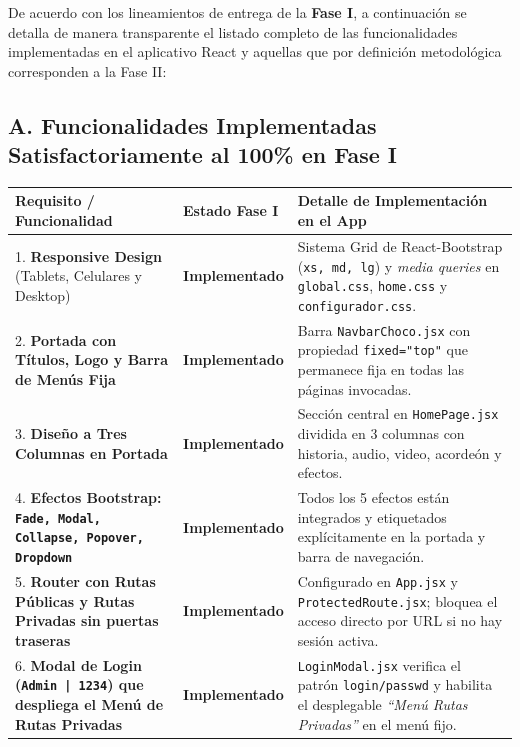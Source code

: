 \documentclass[12pt,letterpaper]{article}
\begin{document}
De acuerdo con los lineamientos de entrega de la \textbf{Fase I}, a continuación se detalla de manera transparente el listado completo de las funcionalidades implementadas en el aplicativo React y aquellas que por definición metodológica corresponden a la Fase II:

\subsection*{A. Funcionalidades Implementadas Satisfactoriamente al 100\% en Fase I}

\begin{longtable}{p{} p{} p{}}
\toprule
\textbf{Requisito / Funcionalidad} & \textbf{Estado Fase I} & \textbf{Detalle de Implementación en el App} \\
\midrule
\endhead
1. \textbf{Responsive Design} (Tablets, Celulares y Desktop) & \textcolor{verdexito}{\textbf{Implementado}} & Sistema Grid de React-Bootstrap (\texttt{xs, md, lg}) y \textit{media queries} en \texttt{global.css}, \texttt{home.css} y \texttt{configurador.css}. \\
\midrule
2. \textbf{Portada con Títulos, Logo y Barra de Menús Fija} & \textcolor{verdexito}{\textbf{Implementado}} & Barra \texttt{NavbarChoco.jsx} con propiedad \texttt{fixed="top"} que permanece fija en todas las páginas invocadas. \\
\midrule
3. \textbf{Diseño a Tres Columnas en Portada} & \textcolor{verdexito}{\textbf{Implementado}} & Sección central en \texttt{HomePage.jsx} dividida en 3 columnas con historia, audio, video, acordeón y efectos. \\
\midrule
4. \textbf{Efectos Bootstrap: \texttt{Fade, Modal, Collapse, Popover, Dropdown}} & \textcolor{verdexito}{\textbf{Implementado}} & Todos los 5 efectos están integrados y etiquetados explícitamente en la portada y barra de navegación. \\
\midrule
5. \textbf{Router con Rutas Públicas y Rutas Privadas sin puertas traseras} & \textcolor{verdexito}{\textbf{Implementado}} & Configurado en \texttt{App.jsx} y \texttt{ProtectedRoute.jsx}; bloquea el acceso directo por URL si no hay sesión activa. \\
\midrule
6. \textbf{Modal de Login (\texttt{Admin | 1234}) que despliega el Menú de Rutas Privadas} & \textcolor{verdexito}{\textbf{Implementado}} & \texttt{LoginModal.jsx} verifica el patrón \texttt{login/passwd} y habilita el desplegable \textit{``Menú Rutas Privadas''} en el menú fijo. \\

\end{longtable}
\end{document}
